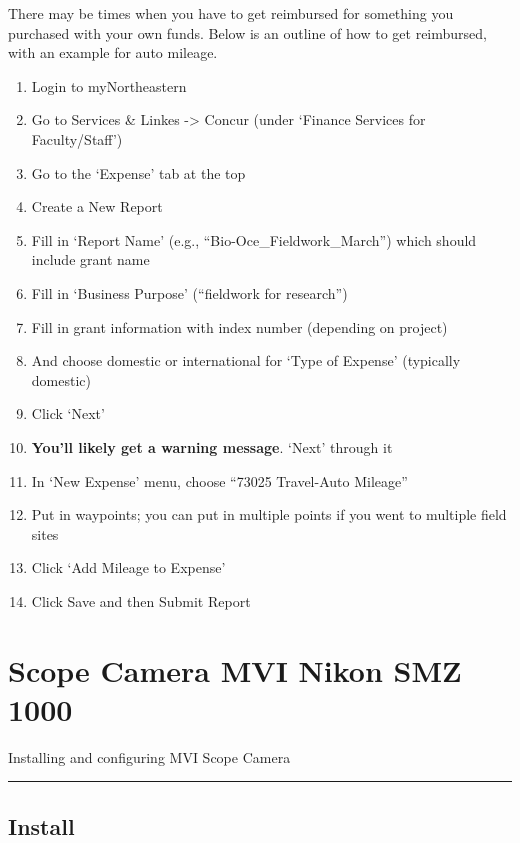 \documentclass[
  letterpaper,
  DIV=11,
  numbers=noendperiod]{scrreprt}
\begin{document}
There may be times when you have to get reimbursed for something you
purchased with your own funds. Below is an outline of how to get
reimbursed, with an example for auto mileage.

\begin{enumerate}
\def\labelenumi{\arabic{enumi}.}
\item
  Login to myNortheastern
\item
  Go to Services \& Linkes -\textgreater{} Concur (under `Finance
  Services for Faculty/Staff')
\item
  Go to the `Expense' tab at the top
\item
  Create a New Report
\item
  Fill in `Report Name' (e.g., ``Bio-Oce\_Fieldwork\_March'') which
  should include grant name
\item
  Fill in `Business Purpose' (``fieldwork for research'')
\item
  Fill in grant information with index number (depending on project)
\item
  And choose domestic or international for `Type of Expense' (typically
  domestic)
\item
  Click `Next'
\item
  \textbf{You'll likely get a warning message}. `Next' through it
\item
  In `New Expense' menu, choose ``73025 Travel-Auto Mileage''
\item
  Put in waypoints; you can put in multiple points if you went to
  multiple field sites
\item
  Click `Add Mileage to Expense'
\item
  Click Save and then Submit Report
\end{enumerate}

\hypertarget{scope-camera-mvi-nikon-smz-1000}{%
\chapter{Scope Camera MVI Nikon SMZ
1000}\label{scope-camera-mvi-nikon-smz-1000}}

Installing and configuring MVI Scope Camera

\begin{center}\rule{0.5\linewidth}{0.5pt}\end{center}

\hypertarget{install}{%
\section*{\texorpdfstring{\textbf{Install}}{Install}}\label{install}}
\end{document}
